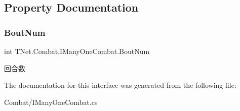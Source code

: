 \subsection{Property Documentation}
\mbox{\label{interface_t_net_1_1_combat_1_1_i_many_one_combat_a4a8f1d6dbfc7525385e4a93f76c87cbf}} 
\subsubsection{\texorpdfstring{Bout\+Num}{BoutNum}}
{\footnotesize\ttfamily int T\+Net.\+Combat.\+I\+Many\+One\+Combat.\+Bout\+Num\hspace{0.3cm}{\ttfamily [get]}}



回合数 



The documentation for this interface was generated from the following file\+:\begin{DoxyCompactItemize}
\item 
Combat/I\+Many\+One\+Combat.\+cs\end{DoxyCompactItemize}
